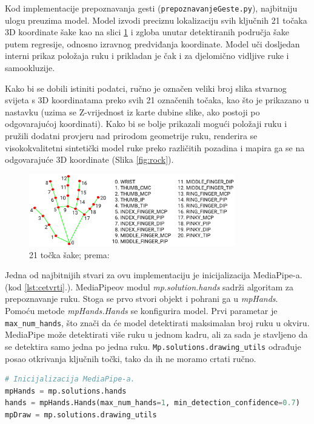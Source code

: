 \documentclass[]{foi} %
\begin{document}
Kod implementacije prepoznavanja gesti (\texttt{prepoznavanjeGeste.py}), najbitniju ulogu preuzima model. Model izvodi preciznu lokalizaciju svih ključnih 21 točaka 3D koordinate šake kao na slici \ref{fig:prsti} i zgloba unutar detektiranih područja šake putem regresije, odnosno izravnog predviđanja koordinate. Model uči dosljedan interni prikaz položaja ruku i prikladan je čak i za djelomično vidljive ruke i samookluzije.

Kako bi se dobili istiniti podatci, ručno je označen veliki broj slika stvarnog svijeta s 3D koordinatama preko svih 21 označenih točaka, kao što je prikazano u nastavku (uzima se Z-vrijednost iz karte dubine slike, ako postoji po odgovarajućoj koordinati). Kako bi se bolje prikazali mogući položaji ruku i pružili dodatni provjeru nad prirodom geometrije ruku, renderira se visokokvalitetni sintetički model ruke preko različitih pozadina i mapira ga se na odgovarajuće 3D koordinate (Slika \ref{fig:rock}).

\begin{figure}[!ht]
    \centering
    \includegraphics[width=0.8\textwidth]{slike/prsti.png}
    \caption{21 točka šake; prema: \cite{opencv}}
    \label{fig:prsti}
\end{figure}

Jedna od najbitnijih stvari za ovu implementaciju je inicijalizacija MediaPipe-a. (kod \ref{lst:cetvrti}.). MediaPipeov modul \textit{mp.solution.hands} sadrži algoritam za prepoznavanje ruku. Stoga se prvo stvori objekt i pohrani ga u \textit{mpHands}.
Pomoću metode \textit{mpHands.Hands} se konfigurira model. Prvi parametar je \texttt{max\_num\_hands}, što znači da će model detektirati maksimalan broj ruku u okviru. MediaPipe može detektirati više ruku u jednom kadru, ali za sada je stavljeno da se detektira samo jedna po jedna ruku.
\texttt{Mp.solutions.drawing\_utils} odrađuje posao otkrivanja ključnih točki, tako da ih ne moramo crtati ručno.

\begin{lstlisting}[language=Python, caption={[Inicijalizacija MediaPipea] Inicijalizacija MediaPipea}, label=lst:cetvrti]
# Inicijalizacija MediaPipe-a.
mpHands = mp.solutions.hands
hands = mpHands.Hands(max_num_hands=1, min_detection_confidence=0.7)
mpDraw = mp.solutions.drawing_utils
\end{lstlisting}
\end{document}
